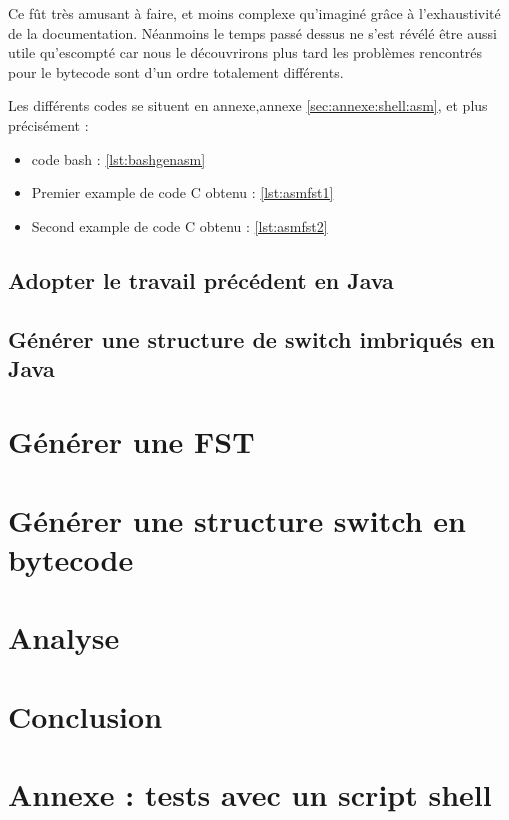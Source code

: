 Ce fût très amusant à faire, et moins complexe qu'imaginé grâce à l'exhaustivité de la documentation.
Néanmoins le temps passé dessus ne s'est révélé être aussi utile qu'escompté car nous le découvrirons
plus tard les problèmes rencontrés pour le bytecode sont d'un ordre totalement différents.\newline


Les différents codes se situent en annexe,annexe \autoref{sec:annexe:shell:asm}, et plus précisément :
\begin{itemize}
    \item code bash : \autoref{lst:bashgenasm}
    \item Premier example de code C obtenu : \autoref{lst:asmfst1}
    \item Second example de code C obtenu : \autoref{lst:asmfst2}
\end{itemize}

\newpage
\subsection{Adopter le travail précédent en Java}

\subsection{Générer une structure de switch imbriqués en Java}

\newpage
\section{Générer une FST}

\newpage
\section{Générer une structure switch en bytecode}

\newpage
\section{Analyse}

\newpage
\section*{Conclusion}

\newpage
\appendix
\section{Annexe : tests avec un script shell}
\label{sec:annexe:shell}

